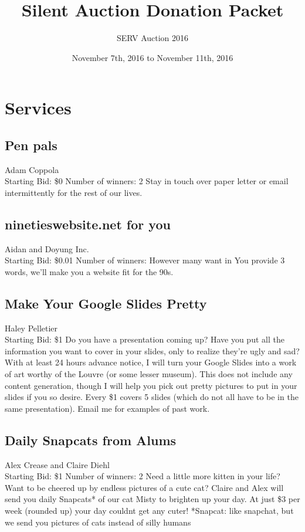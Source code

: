 \documentclass[11pt]{article}
\title{Silent Auction Donation Packet}
\author{SERV Auction 2016}
\date{November 7th, 2016 to November 11th, 2016}
\begin{document}
\maketitle
\section{Services}
\subsection{Pen pals}
Adam Coppola
\\
Starting Bid: \$0
\newline
Number of winners: 2
\newline
Stay in touch over paper letter or email intermittently for the rest of our lives.
\subsection{ninetieswebsite.net for you}
Aidan and Doyung Inc.
\\
Starting Bid: \$0.01
\newline
Number of winners: However many want in
\newline
You provide 3 words, we'll make you a website fit for the 90s.
\subsection{Make Your Google Slides Pretty}
Haley Pelletier
\\
Starting Bid: \$1
\newline
Do you have a presentation coming up? Have you put all the information you want to cover in your slides, only to realize they're ugly and sad? With at least 24 hours advance notice, I will turn your Google Slides into a work of art worthy of the Louvre (or some lesser museum). This does not include any content generation, though I will help you pick out pretty pictures to put in your slides if you so desire. Every \$1 covers 5 slides (which do not all have to be in the same presentation). Email me for examples of past work.
\subsection{Daily Snapcats from Alums}
Alex Crease and Claire Diehl
\\
Starting Bid: \$1
\newline
Number of winners: 2
\newline
Need a little more kitten in your life? Want to be cheered up by endless pictures of a cute cat? Claire and Alex will send you daily Snapcats* of our cat Misty to brighten up your day. At just \$3 per week (rounded up) your day couldnt get any cuter!
*Snapcat: like snapchat, but we send you pictures of cats instead of silly humans
\end{document}
